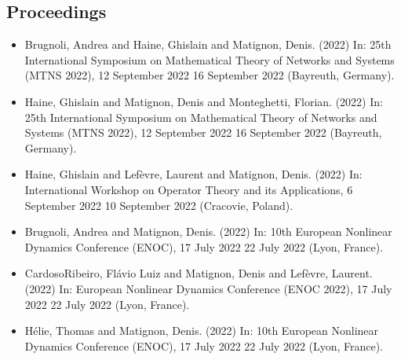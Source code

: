 \documentclass[letterpaper,10pt,english]{sphinxmanual}
\begin{document}
\subsection{Proceedings}
\label{\detokenize{biblio:proceedings}}\begin{itemize}
\item {} 
\sphinxAtStartPar
Brugnoli, Andrea and Haine, Ghislain and Matignon, Denis.  (2022) In: 25th International Symposium on Mathematical Theory of Networks and Systems (MTNS 2022), 12 September 2022 \sphinxhyphen{} 16 September 2022 (Bayreuth, Germany).

\item {} 
\sphinxAtStartPar
Haine, Ghislain and Matignon, Denis and Monteghetti, Florian.  (2022) In: 25th International Symposium on Mathematical Theory of Networks and Systems (MTNS 2022), 12 September 2022 \sphinxhyphen{} 16 September 2022 (Bayreuth, Germany).

\item {} 
\sphinxAtStartPar
Haine, Ghislain and Lefèvre, Laurent and Matignon, Denis.  (2022) In: International Workshop on Operator Theory and its Applications, 6 September 2022 \sphinxhyphen{} 10 September 2022 (Cracovie, Poland).

\item {} 
\sphinxAtStartPar
Brugnoli, Andrea and Matignon, Denis.  (2022) In: 10th European Nonlinear Dynamics Conference (ENOC), 17 July 2022 \sphinxhyphen{} 22 July 2022 (Lyon, France).

\item {} 
\sphinxAtStartPar
Cardoso\sphinxhyphen{}Ribeiro, Flávio Luiz and Matignon, Denis and Lefèvre, Laurent.  (2022) In: European Nonlinear Dynamics Conference (ENOC 2022), 17 July 2022 \sphinxhyphen{} 22 July 2022 (Lyon, France).

\item {} 
\sphinxAtStartPar
Hélie, Thomas and Matignon, Denis.  (2022) In: 10th European Nonlinear Dynamics Conference (ENOC), 17 July 2022 \sphinxhyphen{} 22 July 2022 (Lyon, France).


\end{itemize}
\end{document}
